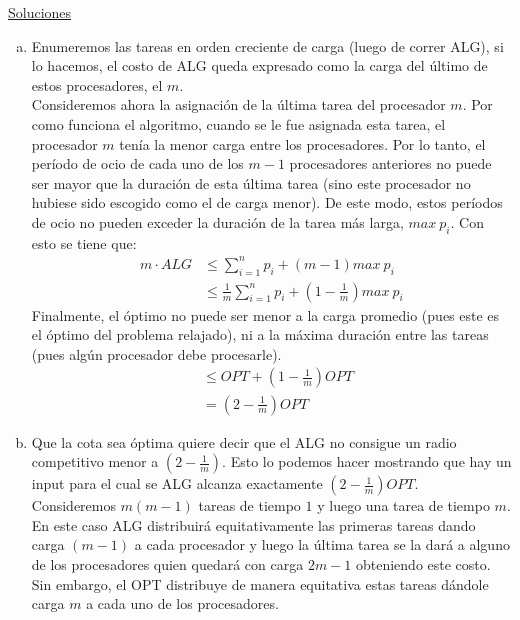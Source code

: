 \documentclass[dcc,uchile]{fcfmcourse}
\begin{document}
\newpage
\begin{center}
{\huge \underline{Soluciones}}
\end{center}
\begin{problems}
\item 
\begin{enumerate}[a)]
    \item Enumeremos las tareas en orden creciente de carga (luego de correr ALG), si lo hacemos, el costo de ALG queda expresado como la carga del último de estos procesadores, el $m$.\\
    Consideremos ahora la asignación de la última tarea del procesador $m$. Por como funciona el algoritmo, cuando se le fue asignada esta tarea, el procesador $m$ tenía la menor carga entre los procesadores. Por lo tanto, el período de ocio de cada uno de los $m-1$ procesadores anteriores no puede ser mayor que la duración de esta última tarea (sino este procesador no hubiese sido escogido como el de carga menor). De este modo, estos períodos de ocio no pueden exceder la duración de la tarea más larga, $max\ p_{i}$. Con esto se tiene que:
    \begin{align*}
        m\cdot ALG &\le \sum_{i=1}^n p_{i} + (m-1)max\ p_{i}\\
        &\le \frac{1}{m} \sum_{i=1}^n p_{i} + \left(1-\frac{1}{m}\right)max\ p_{i}
    \end{align*}
    Finalmente, el óptimo no puede ser menor a la carga promedio (pues este es el óptimo del problema relajado), ni a la máxima duración entre las tareas (pues algún procesador debe procesarle).
    \begin{align*}
        & \le OPT + \left(1-\frac{1}{m}\right)OPT\\
        & = \left(2-\frac{1}{m}\right)OPT        
    \end{align*}
    \item Que la cota sea óptima quiere decir que el ALG no consigue un radio competitivo menor a $\left(2-\frac{1}{m}\right)$. Esto lo podemos hacer mostrando que hay un input para el cual se ALG alcanza exactamente $\left(2-\frac{1}{m}\right)OPT$.\\
    
    Consideremos $m(m-1)$ tareas de tiempo $1$ y luego una tarea de tiempo $m$. En este caso ALG distribuirá equitativamente las primeras tareas dando carga $(m-1)$ a cada procesador y luego la última tarea se la dará a alguno de los procesadores quien quedará con carga $2m-1$ obteniendo este costo. Sin embargo, el OPT distribuye de manera equitativa estas tareas dándole carga $m$ a cada uno de los procesadores.\\
    

\end{enumerate}
\end{problems}
\end{document}
